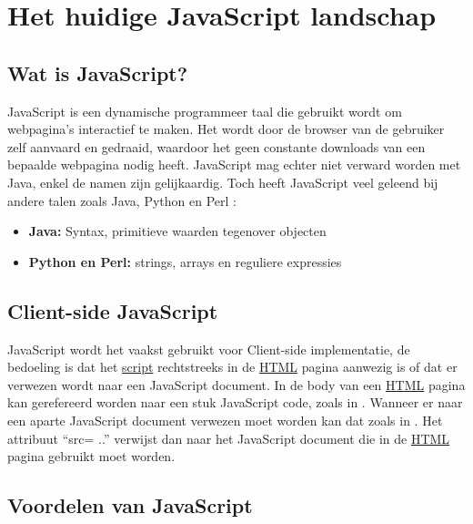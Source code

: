 \chapter{Het huidige JavaScript landschap}\label{ch:javascriptland}

\section{Wat is JavaScript?}\label{sec:JavaScript}

JavaScript is een dynamische programmeer taal die gebruikt wordt om webpagina's interactief te maken. Het wordt door de browser van de gebruiker zelf aanvaard en gedraaid, waardoor het geen constante downloads van een bepaalde webpagina nodig heeft. 
JavaScript mag echter niet verward worden met Java, enkel de namen zijn gelijkaardig. Toch heeft JavaScript veel geleend bij andere talen zoals Java, Python en Perl : 
	\begin{itemize}
		\item \textbf{Java:} Syntax, primitieve waarden tegenover objecten
		\item \textbf{Python en Perl:} strings, arrays en reguliere expressies
	\end{itemize}
\section{Client-side JavaScript}\label{sec:csjs}
JavaScript wordt het vaakst gebruikt voor Client-side implementatie, de bedoeling is dat het \hyperref[script]{script} rechtstreeks in de \hyperref[html]{HTML} pagina aanwezig is of dat er verwezen wordt naar een JavaScript document.
In de body van een \hyperref[html]{HTML} pagina kan gerefereerd worden naar een stuk JavaScript code, zoals in .
	Wanneer er naar een aparte JavaScript document verwezen moet worden kan dat zoals in . Het attribuut “src= ..” verwijst dan naar het JavaScript document die in de \hyperref[html]{HTML} pagina gebruikt moet worden.   
	\section{Voordelen van JavaScript}
	
